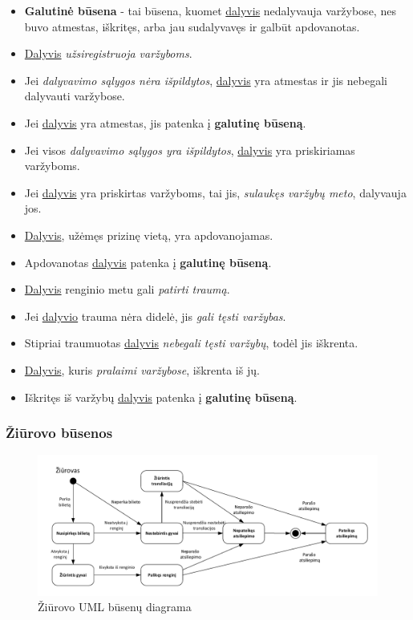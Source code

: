 \documentclass{VUMIFPSkursinis}
\begin{document}
      \begin{itemize}
        \item \textbf{Galutinė būsena} - tai būsena, kuomet \underline{dalyvis} nedalyvauja varžybose, nes buvo atmestas, iškritęs, arba jau sudalyvavęs ir galbūt apdovanotas.
        \item \underline {Dalyvis} \textit{užsiregistruoja varžyboms}.
        \item Jei \textit{dalyvavimo sąlygos nėra išpildytos}, \underline{dalyvis} yra atmestas ir jis nebegali dalyvauti varžybose.
        \item Jei \underline{dalyvis} yra atmestas, jis patenka į \textbf{galutinę būseną}.
        \item Jei visos \textit{dalyvavimo sąlygos yra išpildytos}, \underline{dalyvis} yra priskiriamas varžyboms.
        \item Jei \underline{dalyvis} yra priskirtas varžyboms, tai jis, \textit{sulaukęs varžybų meto}, dalyvauja jos.
        \item \underline{Dalyvis}, užėmęs prizinę vietą, yra apdovanojamas.
        \item Apdovanotas \underline{dalyvis} patenka į \textbf{galutinę būseną}.
        \item \underline{Dalyvis} renginio metu gali \textit{patirti traumą}.
        \item Jei \underline{dalyvio} trauma nėra didelė, jis \textit{gali tęsti varžybas}.
        \item Stipriai traumuotas \underline{dalyvis} \textit{nebegali tęsti varžybų}, todėl jis iškrenta.
        \item \underline{Dalyvis}, kuris \textit{pralaimi varžybose}, iškrenta iš jų.
        \item Iškritęs iš varžybų \underline{dalyvis} patenka į \textbf{galutinę būseną}.
      \end{itemize}
	\subsubsection*{Žiūrovo būsenos}
	  \begin{figure}[H]
        \centering
        \includegraphics[width=\textwidth]{img/BusenuDiagrama2}
        \caption{Žiūrovo UML būsenų diagrama}
        \label{fig:ziurovoBusenuDiagrama}
      \end{figure}
        
\end{document}
